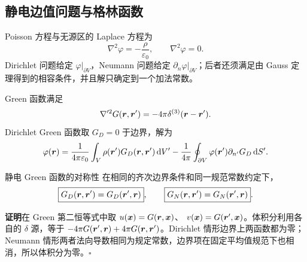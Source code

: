 \subsection{静电边值问题与格林函数}

Poisson 方程与无源区的 Laplace 方程为
\[
 \nabla^2\varphi=-\frac\rho{\varepsilon_0},
 \qquad \nabla^2\varphi=0.
\]
Dirichlet 问题给定 $\varphi|_{\partial V}$，Neumann 问题给定
$\partial_n\varphi|_{\partial V}$；后者还须满足由 Gauss 定理得到的相容条件，并且解只确定到一个加法常数。

Green 函数满足
\[
 \nabla'^2G(\bm{r},\bm{r}')=-4\pi\delta^{(3)}(\bm{r}-\bm{r}').
\]
Dirichlet Green 函数取 $G_D=0$ 于边界，解为
\[
 \varphi(\bm{r})=\frac1{4\pi\varepsilon_0}\int_V
 \rho(\bm{r}')G_D(\bm{r},\bm{r}')\mathop{}\!\mathrm d V'
 -\frac1{4\pi}\oint_{\partial V}
 \varphi(\bm{r}')\partial_{n'}G_D\mathop{}\!\mathrm d S'.
\]


\begin{advtheorem}{静电 Green 函数的对称性}\label{advA4:thm:green-symmetry}
在相同的齐次边界条件和同一规范常数约定下，
\[
 \boxed{G_D(\bm{r},\bm{r}')=G_D(\bm{r}',\bm{r})},
 \qquad
 \boxed{G_N(\bm{r},\bm{r}')=G_N(\bm{r}',\bm{r})}.
\]
\end{advtheorem}
\noindent\textbf{证明}\quad 在 Green 第二恒等式中取
$u(\bm{x})=G(\bm{r},\bm{x})$、
$v(\bm{x})=G(\bm{r}',\bm{x})$。体积分利用各自的 $\delta$ 源，等于
$-4\pi G(\bm{r}',\bm{r})+4\pi G(\bm{r},\bm{r}')$。Dirichlet 情形边界上两函数都为零；Neumann 情形两者法向导数相同为规定常数，边界项在固定平均值规范下也相消，所以体积分为零。\hfill$\square$

